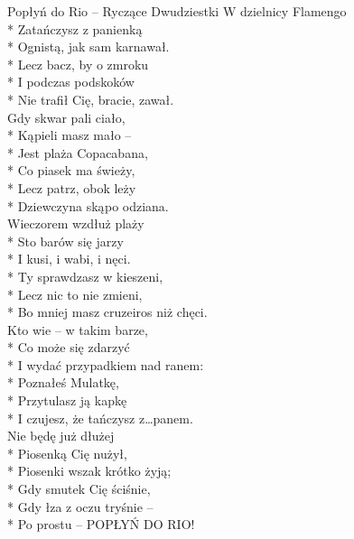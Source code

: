 \begin{piosenka_dluga}{Popłyń do Rio -- Ryczące Dwudziestki}
W dzielnicy Flamengo \\*
Zatańczysz z panienką \\*
Ognistą, jak sam karnawał. \\*
Lecz bacz, by o zmroku \\*
I podczas podskoków \\*
Nie trafił Cię, bracie, zawał. \\[\zwrotkaspace]

Gdy skwar pali ciało, \\*
Kąpieli masz mało -- \\*
Jest plaża Copacabana, \\*
Co piasek ma świeży, \\*
Lecz patrz, obok leży \\*
Dziewczyna skąpo odziana. \\[\zwrotkaspace]

Wieczorem wzdłuż plaży  \\*
Sto barów się jarzy \\*
I kusi, i wabi, i nęci. \\* 
Ty sprawdzasz w kieszeni, \\* 
Lecz nic to nie zmieni, \\*
Bo mniej masz cruzeiros niż chęci. \\[\zwrotkaspace]

Kto wie -- w takim barze, \\*
Co może się zdarzyć \\*
I wydać przypadkiem nad ranem: \\*
Poznałeś Mulatkę, \\*
Przytulasz ją kapkę \\*
I czujesz, że tańczysz z\ldots panem. \\[\zwrotkaspace]

Nie będę już dłużej \\*
Piosenką Cię nużył, \\*
Piosenki wszak krótko żyją; \\* 
Gdy smutek Cię ściśnie, \\*
Gdy łza z oczu tryśnie -- \\*
Po prostu -- POPŁYŃ DO RIO!
\end{piosenka_dluga}